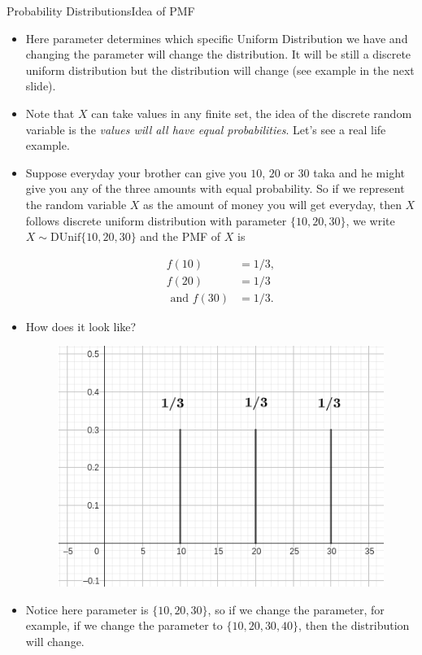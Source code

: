 \documentclass[8pt, usepdftitle=false]{beamer}
\begin{document}
\begin{frame}[allowframebreaks]{Probability Distributions}{Idea of PMF}
\begin{itemize}
\item Here parameter determines which specific Uniform Distribution we have and changing the parameter will change the distribution. It will be still a discrete uniform distribution but the distribution will change (see example in the next slide).


\item Note that $X$ can take values in any finite set, the idea of the discrete random variable is the \emph{values will all have equal probabilities}. Let's see a real life example.


\framebreak

\item  Suppose everyday your brother can give you $10$, $20$ or $30$ taka and he might give you any of the three amounts with equal probability. So if we represent the random variable $X$ as the amount of money you will get everyday, then $X$ follows discrete uniform distribution with parameter $\{10, 20, 30\}$, we write $X \sim \mathrm{DUnif}\{10, 20, 30\}$ and the PMF of $X$ is

\begin{align*}
	f(10) &= 1/3, \\
	f(20) &= 1/3 \\
	\text{ and } f(30) &= 1/3.
\end{align*}

\item How does it look like?

\begin{figure}
	\includegraphics[scale = .4]{Images/DiscreteUniform.png}
\end{figure}

\item Notice here parameter is $\{10, 20, 30\}$, so if we change the parameter, for example, if we change the parameter to $\{10, 20, 30, 40\}$, then the distribution will change.


\end{itemize}

\end{frame}
\end{document}
